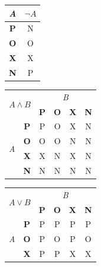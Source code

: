 \documentclass[a4paper, 11pt]{article}
\begin{document}
\begin{table}[ht]
    \begin{center}
        \begin{tabular}{|c|c|}
            \hline
            \emph{A}   & $\neg A$ \\ \hline
            \textbf{P} & N        \\ \hline
            \textbf{O} & O        \\ \hline
            \textbf{X} & X        \\ \hline
            \textbf{N} & P        \\ \hline
        \end{tabular}
        \begin{tabular}{|c|c|c|c|c|c|}
            \hline
            \multicolumn{2}{|c|}{\multirow{2}{*}{$A \wedge B$}} & \multicolumn{4}{c|}{\emph{B}}               \\ \cline{3-6}
            \multicolumn{2}{|c|}{}                        & \textbf{P} & \textbf{O} & \textbf{X} & \textbf{N} \\ \hline
            \multirow{4}{*}{\emph{A}} & \textbf{P}        & P          & O          & X          & N          \\ \cline{2-6}
                                      & \textbf{O}        & O          & O          & N          & N          \\ \cline{2-6}
                                      & \textbf{X}        & X          & N          & X          & N          \\ \cline{2-6}
                                      & \textbf{N}        & N          & N          & N          & N          \\ \hline
        \end{tabular}
        \begin{tabular}{|c|c|c|c|c|c|}
            \hline
            \multicolumn{2}{|c|}{\multirow{2}{*}{$A \vee B$}} & \multicolumn{4}{c|}{\emph{B}}                 \\ \cline{3-6}
            \multicolumn{2}{|c|}{}                        & \textbf{P} & \textbf{O} & \textbf{X} & \textbf{N} \\ \hline
            \multirow{4}{*}{\emph{A}} & \textbf{P}        & P          & P          & P          & P          \\ \cline{2-6}
                                      & \textbf{O}        & P          & O          & P          & O          \\ \cline{2-6}
                                      & \textbf{X}        & P          & P          & X          & X          \\ \cline{2-6}

\end{tabular}
\end{center}
\end{table}
\end{document}
